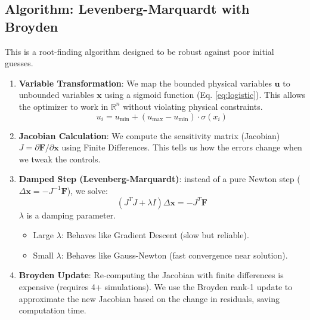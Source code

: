 \documentclass[11pt]{article}
\begin{document}
\subsection{Algorithm: Levenberg-Marquardt with Broyden}
This is a root-finding algorithm designed to be robust against poor initial guesses.

\begin{enumerate}
    \item \textbf{Variable Transformation}: We map the bounded physical variables $\bm{u}$ to unbounded variables $\bm{x}$ using a sigmoid function (Eq. \ref{eq:logistic}). This allows the optimizer to work in $\mathbb{R}^n$ without violating physical constraints.
    \begin{equation}
        \label{eq:logistic}
        u_i = u_{\min} + (u_{\max} - u_{\min}) \cdot \sigma(x_i)
    \end{equation}
    
    \item \textbf{Jacobian Calculation}: We compute the sensitivity matrix (Jacobian) $J = \partial \bm{F} / \partial \bm{x}$ using Finite Differences. This tells us how the errors change when we tweak the controls.
    
    \item \textbf{Damped Step (Levenberg-Marquardt)}: instead of a pure Newton step ($\Delta \bm{x} = -J^{-1}\bm{F}$), we solve:
    \begin{equation}
        (J^T J + \lambda I) \Delta \bm{x} = -J^T \bm{F}
    \end{equation}
    $\lambda$ is a damping parameter.
    \begin{itemize}
        \item Large $\lambda$: Behaves like Gradient Descent (slow but reliable).
        \item Small $\lambda$: Behaves like Gauss-Newton (fast convergence near solution).
    \end{itemize}
    
    \item \textbf{Broyden Update}: Re-computing the Jacobian with finite differences is expensive (requires 4+ simulations). We use the Broyden rank-1 update to approximate the new Jacobian based on the change in residuals, saving computation time.
\end{enumerate}
\end{document}
